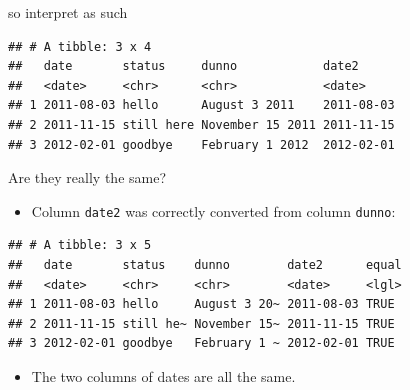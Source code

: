 \documentclass[
  ignorenonframetext,
]{beamer}
\newenvironment{Shaded}{\begin{snugshade}}{\end{snugshade}}
\newcommand{\DataTypeTok}[1]{\textcolor[rgb]{0.13,0.29,0.53}{#1}}
\newcommand{\KeywordTok}[1]{\textcolor[rgb]{0.13,0.29,0.53}{\textbf{#1}}}
\newcommand{\NormalTok}[1]{#1}
\newcommand{\OperatorTok}[1]{\textcolor[rgb]{0.81,0.36,0.00}{\textbf{#1}}}
\newcommand{\StringTok}[1]{\textcolor[rgb]{0.31,0.60,0.02}{#1}}
\providecommand{\tightlist}{%
  \setlength{\itemsep}{0pt}\setlength{\parskip}{0pt}}
\begin{document}
\begin{frame}[fragile]{so interpret as such}
\protect\hypertarget{so-interpret-as-such}{}

\begin{Shaded}
\end{Shaded}

\begin{verbatim}
## # A tibble: 3 x 4
##   date       status     dunno            date2     
##   <date>     <chr>      <chr>            <date>    
## 1 2011-08-03 hello      August 3 2011    2011-08-03
## 2 2011-11-15 still here November 15 2011 2011-11-15
## 3 2012-02-01 goodbye    February 1 2012  2012-02-01
\end{verbatim}

\end{frame}

\begin{frame}[fragile]{Are they really the same?}
\protect\hypertarget{are-they-really-the-same}{}

\begin{itemize}
\tightlist
\item
  Column \texttt{date2} was correctly converted from column
  \texttt{dunno}:
\end{itemize}

\begin{Shaded}
\end{Shaded}

\begin{verbatim}
## # A tibble: 3 x 5
##   date       status    dunno        date2      equal
##   <date>     <chr>     <chr>        <date>     <lgl>
## 1 2011-08-03 hello     August 3 20~ 2011-08-03 TRUE 
## 2 2011-11-15 still he~ November 15~ 2011-11-15 TRUE 
## 3 2012-02-01 goodbye   February 1 ~ 2012-02-01 TRUE
\end{verbatim}

\begin{itemize}
\tightlist
\item
  The two columns of dates are all the same.
\end{itemize}

\end{frame}
\end{document}
